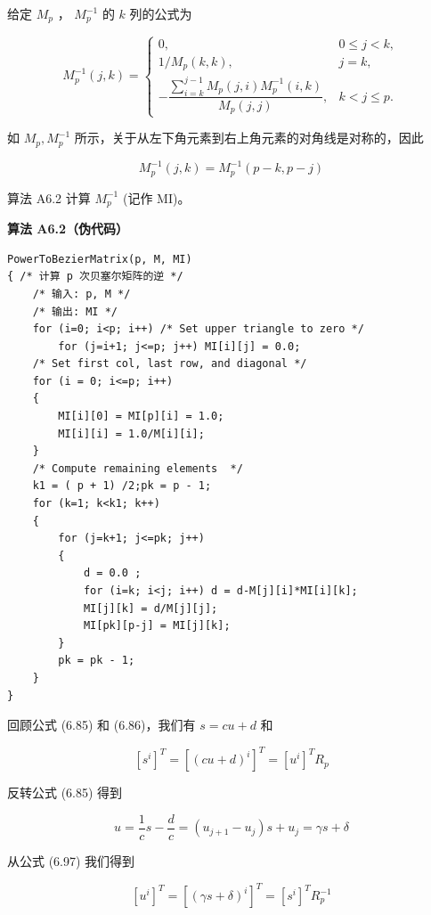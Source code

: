\documentclass[../main.tex]{subfiles}
\begin{document}
给定 \({M}_{p}\) ， \({M}_{p}^{-1}\) 的 \(k\) 列的公式为

\[
M_p^{-1}(j,k)=\begin{cases}
0, & 0\le j<k,\\
1/M_p(k,k), & j=k,\\
-\dfrac{\sum_{i=k}^{j-1}M_p(j,i)M_p^{-1}(i,k)}{M_p(j,j)}, & k<j\le p.
\end{cases} \tag{6.95}
\]

如 \({M}_{p},{M}_{p}^{-1}\) 所示，关于从左下角元素到右上角元素的对角线是对称的，因此

\[
{M}_{p}^{-1}\left( {j,k}\right)  = {M}_{p}^{-1}\left( {p - k,p - j}\right)  \tag{6.96}
\]

算法 A6.2 计算 \({M}_{p}^{-1}\) (记作 MI)。



\par\medskip\noindent\textbf{算法 A6.2（伪代码）}\par
\begin{verbatim}
PowerToBezierMatrix(p, M, MI)
{ /* 计算 p 次贝塞尔矩阵的逆 */
    /* 输入: p, M */
    /* 输出: MI */
    for (i=0; i<p; i++) /* Set upper triangle to zero */
        for (j=i+1; j<=p; j++) MI[i][j] = 0.0;
    /* Set first col, last row, and diagonal */
    for (i = 0; i<=p; i++)
    {
        MI[i][0] = MI[p][i] = 1.0;
        MI[i][i] = 1.0/M[i][i];
    }
    /* Compute remaining elements  */
    k1 = ( p + 1) /2;pk = p - 1;
    for (k=1; k<k1; k++)
    {
        for (j=k+1; j<=pk; j++)
        {
            d = 0.0 ;
            for (i=k; i<j; i++) d = d-M[j][i]*MI[i][k];
            MI[j][k] = d/M[j][j];
            MI[pk][p-j] = MI[j][k];
        }
        pk = pk - 1;
    }
}
\end{verbatim}

回顾公式 (6.85) 和 (6.86)，我们有 \(s = {cu} + d\) 和

\[
{\left\lbrack  {s}^{i}\right\rbrack  }^{T} = {\left\lbrack  {\left( cu + d\right) }^{i}\right\rbrack  }^{T} = {\left\lbrack  {u}^{i}\right\rbrack  }^{T}{R}_{p} \tag{6.97}
\]

反转公式 (6.85) 得到

\[
u = \frac{1}{c}s - \frac{d}{c} = \left( {{u}_{j + 1} - {u}_{j}}\right) s + {u}_{j} = {\gamma s} + \delta
\]

从公式 (6.97) 我们得到

\[
{\left\lbrack  {u}^{i}\right\rbrack  }^{T} = {\left\lbrack  {\left( \gamma s + \delta \right) }^{i}\right\rbrack  }^{T} = {\left\lbrack  {s}^{i}\right\rbrack  }^{T}{R}_{p}^{-1}
\]
\end{document}
